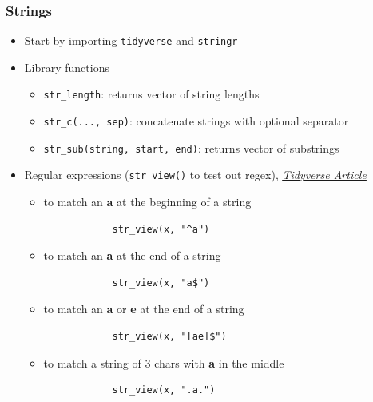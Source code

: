 \documentclass{article}
\begin{document}
\begin{multicols}{2}
\subsubsection*{Strings}
\begin{itemize}
	\item Start by importing \texttt{tidyverse} and \texttt{stringr}
	\item Library functions
	\begin{itemize}
		\item \texttt{str\_length}: returns vector of string lengths
		\item \texttt{str\_c(..., sep)}: concatenate strings with optional separator
		\item \texttt{str\_sub(string, start, end)}: returns vector of substrings
	\end{itemize}
	\item Regular expressions (\texttt{str\_view()} to test out regex), \href{https://stringr.tidyverse.org/articles/regular-expressions.html}{\textit{\underline{Tidyverse Article}}}
	\begin{itemize}
		\item to match an \textbf{a} at the beginning of a string
		\begin{verbatim}
			str_view(x, "^a")
		\end{verbatim}
		\item to match an \textbf{a} at the end of a string
		\begin{verbatim}
			str_view(x, "a$")
		\end{verbatim}
		\item to match an \textbf{a} or \textbf{e} at the end of a string
		\begin{verbatim}
			str_view(x, "[ae]$")
		\end{verbatim}
		\item to match a string of 3 chars with \textbf{a} in the middle
		\begin{verbatim}
			str_view(x, ".a.")
		\end{verbatim}


\end{itemize}
\end{itemize}
\end{multicols}
\end{document}

